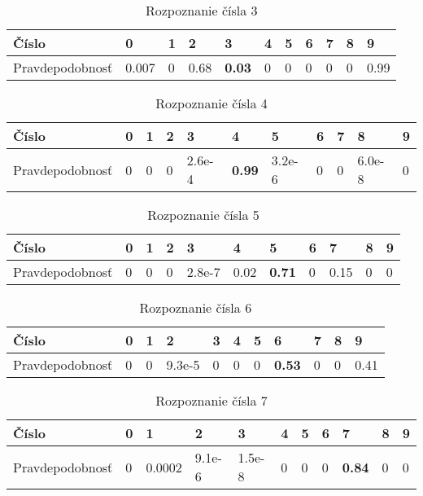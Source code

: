 \begin{table}[H]
  \begin{tabular}{ | l | l | l | l | l | l | l | l | l | l | l |}
    \hline
    Číslo & 0 & 1 & 2 & 3 & 4 & 5 & 6 & 7 & 8 & 9 \\ \hline
    Pravdepodobnosť & 0.007 & 0 & 0.68 & \textbf{0.03} & 0 & 0 & 0 & 0 & 0 & 0.99 \\
    \hline
  \end{tabular}
  \caption[Rozpoznanie čísla 3]{Rozpoznanie čísla 3}
\end{table}

\begin{table}[H]
  \begin{tabular}{ | l | l | l | l | l | l | l | l | l | l | l |}
    \hline
    Číslo & 0 & 1 & 2 & 3 & 4 & 5 & 6 & 7 & 8 & 9 \\ \hline
    Pravdepodobnosť & 0 & 0 & 0 & 2.6e-4 & \textbf{0.99} & 3.2e-6 & 0 & 0 & 6.0e-8 & 0 \\
    \hline
  \end{tabular}
  \caption[Rozpoznanie čísla 4]{Rozpoznanie čísla 4}
\end{table}

\begin{table}[H]
  \begin{tabular}{ | l | l | l | l | l | l | l | l | l | l | l |}
    \hline
    Číslo & 0 & 1 & 2 & 3 & 4 & 5 & 6 & 7 & 8 & 9 \\ \hline
    Pravdepodobnosť & 0 & 0 & 0 & 2.8e-7 & 0.02 & \textbf{0.71} & 0 & 0.15 & 0 & 0 \\
    \hline
  \end{tabular}
  \caption[Rozpoznanie čísla 5]{Rozpoznanie čísla 5}
\end{table}

\begin{table}[H]
  \begin{tabular}{ | l | l | l | l | l | l | l | l | l | l | l |}
    \hline
    Číslo & 0 & 1 & 2 & 3 & 4 & 5 & 6 & 7 & 8 & 9 \\ \hline
    Pravdepodobnosť & 0 & 0 & 9.3e-5 & 0 & 0 & 0 & \textbf{0.53} & 0 & 0 & 0.41 \\
    \hline
  \end{tabular}
  \caption[Rozpoznanie čísla 6]{Rozpoznanie čísla 6}
\end{table}

\begin{table}[H]
  \begin{tabular}{ | l | l | l | l | l | l | l | l | l | l | l |}
    \hline
    Číslo & 0 & 1 & 2 & 3 & 4 & 5 & 6 & 7 & 8 & 9 \\ \hline
    Pravdepodobnosť & 0 & 0.0002 & 9.1e-6 & 1.5e-8 & 0 & 0 & 0 & \textbf{0.84} & 0 & 0 \\
    \hline
  \end{tabular}
  \caption[Rozpoznanie čísla 7]{Rozpoznanie čísla 7}
\end{table}

